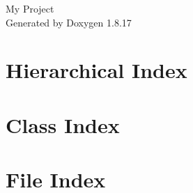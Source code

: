 \let\mypdfximage\pdfximage\def\pdfximage{\immediate\mypdfximage}\documentclass[twoside]{book}
\newcommand{\+}{\discretionary{\mbox{\scriptsize$\hookleftarrow$}}{}{}}
\newcommand{\clearemptydoublepage}{%
  \newpage{\pagestyle{empty}\cleardoublepage}%
}
\begin{document}
\hypersetup{pageanchor=false,
             bookmarksnumbered=true,
             pdfencoding=unicode
            }
\begin{titlepage}
\vspace*{7cm}
\begin{center}%
{\Large My Project }\\
\vspace*{1cm}
{\large Generated by Doxygen 1.8.17}\\
\end{center}
\end{titlepage}
\clearemptydoublepage
{}
\tableofcontents
\clearemptydoublepage
{}
\hypersetup{pageanchor=true}

\chapter{Hierarchical Index}

\chapter{Class Index}

\chapter{File Index}

\end{document}
